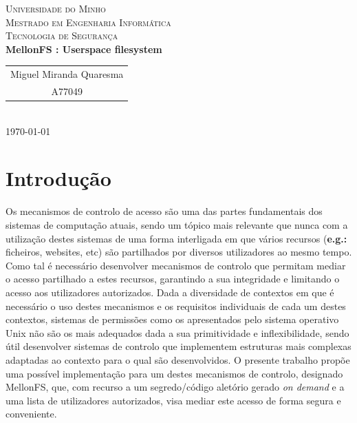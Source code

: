 \documentclass{article}
\begin{document}
{
\center
\textsc{\Large Universidade do Minho} \\ [0.5cm]
\textsc{\Large Mestrado em Engenharia Informática} \\ [0.5cm]
\textsc{\large Tecnologia de Segurança} \\ [0.5cm]

{\LARGE \bfseries MellonFS : Userspace filesystem } \\[0.5cm]

\begin{tabular}{c}
    Miguel Miranda Quaresma \\
    A77049  \\
\end{tabular} \\[0.5cm]

\today \\[1cm]
}

\section{Introdução}
Os mecanismos de controlo de acesso são uma das partes fundamentais dos sistemas de computação atuais, sendo um tópico mais relevante que nunca com a
utilização destes sistemas de uma forma interligada em que vários recursos (\textbf{e.g.:} ficheiros, websites, etc) são partilhados por diversos 
utilizadores ao mesmo tempo. Como tal é necessário desenvolver mecanismos de controlo que permitam mediar o acesso partilhado a estes recursos, 
garantindo a sua integridade e limitando o acesso aos utilizadores autorizados. Dada a diversidade de contextos em que é necessário o uso destes mecanismos
e os requisitos individuais de cada um destes contextos, sistemas de permissões como os apresentados pelo sistema operativo Unix não são os mais adequados
dada a sua primitividade e inflexibilidade, sendo útil desenvolver sistemas de controlo que implementem estruturas mais complexas adaptadas ao contexto
para o qual são desenvolvidos. 
O presente trabalho propõe uma possível implementação para um destes mecanismos de controlo, designado MellonFS, que, com recurso a um segredo/código aletório 
gerado \textit{on demand} e a uma lista de utilizadores autorizados, visa mediar este acesso de forma segura e conveniente.
\end{document}
